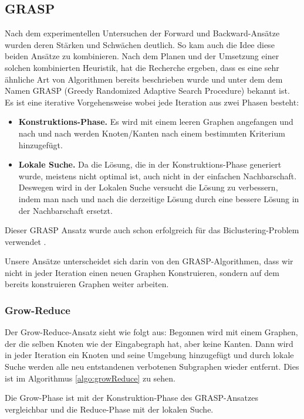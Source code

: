 \documentclass[12pt,a4paper,onecolumn,oneside,titlepage]{article}
\begin{document}
\subsection{GRASP}
Nach dem experimentellen Untersuchen der Forward und Backward-Ansätze wurden deren Stärken und Schwächen deutlich. So kam auch die Idee diese beiden Ansätze zu kombinieren. Nach dem Planen und der Umsetzung einer solchen kombinierten Heuristik, hat die Recherche ergeben, dass es eine sehr ähnliche Art von Algorithmen bereits beschrieben wurde und unter dem dem Namen GRASP (Greedy Randomized Adaptive Search Procedure) \cite{Feo95} \cite{Bastos2014} bekannt ist. Es ist eine iterative Vorgehensweise wobei jede Iteration aus zwei Phasen besteht: 
\begin{itemize}
\item \textbf{Konstruktions-Phase.} Es wird mit einem leeren Graphen angefangen und nach und nach werden Knoten/Kanten nach einem bestimmten Kriterium hinzugefügt.
\item \textbf{Lokale Suche.} Da die Lösung, die in der Konstruktions-Phase generiert wurde, meistens nicht optimal ist, auch nicht in der einfachen Nachbarschaft. Deswegen wird in der Lokalen Suche versucht die Lösung zu verbessern, indem man nach und nach die derzeitige Lösung durch eine bessere Lösung in der Nachbarschaft ersetzt.
\end{itemize}
Dieser GRASP Ansatz wurde auch schon erfolgreich für das Biclustering-Problem verwendet \cite{De12}.

Unsere Ansätze unterscheidet sich darin von den GRASP-Algorithmen, dass wir nicht in jeder Iteration einen neuen Graphen Konstruieren, sondern auf dem bereits konstruieren Graphen weiter arbeiten. 

\subsubsection{Grow-Reduce}
Der Grow-Reduce-Ansatz sieht wie folgt aus: Begonnen wird mit einem Graphen, der die selben Knoten wie der Eingabegraph hat, aber keine Kanten. Dann wird in jeder Iteration ein Knoten und seine Umgebung hinzugefügt und durch lokale Suche werden alle neu entstandenen verbotenen Subgraphen wieder entfernt. Dies ist im Algorithmus \ref{algo:growReduce} zu sehen. 

Die Grow-Phase ist mit der Konstruktion-Phase des GRASP-Ansatzes vergleichbar und die Reduce-Phase mit der lokalen Suche.
\end{document}
